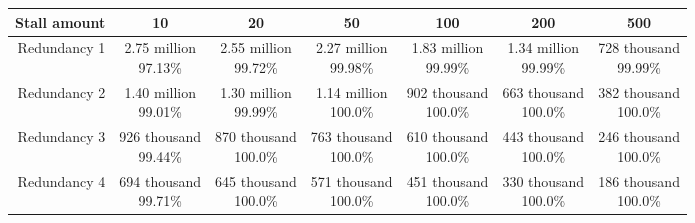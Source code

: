 \begin{figure}
  \small
  \begin{tabular}{ r | c | c | c | c | c | c }
    Stall amount & 10 & 20 & 50 & 100 & 200 & 500 \\ \hline
    Redundancy 1 & \makecell{2.75 million\\97.13\%} &
                   \makecell{2.55 million\\99.72\%} &
                   \makecell{2.27 million\\99.98\%} &
                   \makecell{1.83 million\\99.99\%} &
                   \makecell{1.34 million\\99.99\%} &
                   \makecell{728 thousand\\99.99\%} \\ \hline
    Redundancy 2 & \makecell{1.40 million\\99.01\%} &
                   \makecell{1.30 million\\99.99\%} &
                   \makecell{1.14 million\\100.0\%} &
                   \makecell{902 thousand\\100.0\%} &
                   \makecell{663 thousand\\100.0\%} &
                   \makecell{382 thousand\\100.0\%} \\ \hline
    Redundancy 3 & \makecell{926 thousand\\99.44\%} &
                   \makecell{870 thousand\\100.0\%} &
                   \makecell{763 thousand\\100.0\%} &
                   \makecell{610 thousand\\100.0\%} &
                   \makecell{443 thousand\\100.0\%} &
                   \makecell{246 thousand\\100.0\%} \\ \hline
    Redundancy 4 & \makecell{694 thousand\\99.71\%} &
                   \makecell{645 thousand\\100.0\%} &
                   \makecell{571 thousand\\100.0\%} &
                   \makecell{451 thousand\\100.0\%} &
                   \makecell{330 thousand\\100.0\%} &
                   \makecell{186 thousand\\100.0\%} \\

\end{tabular}
\end{figure}
